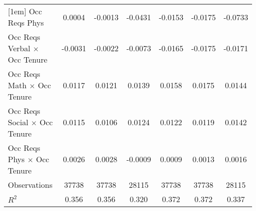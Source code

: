 {\begin{tabular}{l*{6}{c}}
[1em]
Occ Reqs Phys       &      0.0004         &     -0.0013         &     -0.0431         &     -0.0153         &     -0.0175         &     -0.0733\sym{**} \\
[1em]
Occ Reqs Verbal $\times$ Occ Tenure&     -0.0031         &     -0.0022         &     -0.0073         &     -0.0165\sym{**} &     -0.0175\sym{**} &     -0.0171\sym{*}  \\
[1em]
Occ Reqs Math $\times$ Occ Tenure&      0.0117         &      0.0121         &      0.0139         &      0.0158\sym{**} &      0.0175\sym{***}&      0.0144\sym{*}  \\
[1em]
Occ Reqs Social $\times$ Occ Tenure&      0.0115\sym{***}&      0.0106\sym{***}&      0.0124\sym{***}&      0.0122\sym{***}&      0.0119\sym{***}&      0.0142\sym{***}\\
[1em]
Occ Reqs Phys $\times$ Occ Tenure&      0.0026         &      0.0028         &     -0.0009         &      0.0009         &      0.0013         &      0.0016         \\
\hline  
Observations        &       37738         &       37738         &       28115         &       37738         &       37738         &       28115         \\
\(R^{2}\)           &       0.356         &       0.356         &       0.320         &       0.372         &       0.372         &       0.337         \\
\hline  
\end{tabular}
}
